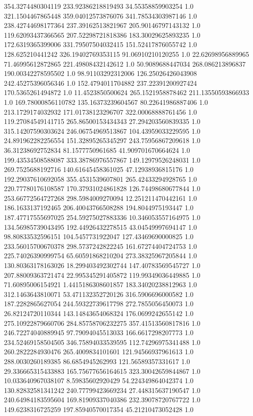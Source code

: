 354.3274480304119	233.92386218819493	34.55358859903254	1.0
321.1504467865448	359.04012573876076	341.78534303987146	1.0
238.42744698177364	237.39162513821967	205.90146797143132	1.0
119.62093437366565	207.52298721818386	183.30029625893235	1.0
172.6319365399006	331.79507504032415	151.52417876055742	1.0
128.625210441242	326.19402769353115	91.06910210120255	1.0
22.62698956889965	71.46995612872865	221.49808432142612	1.0
50.9089688447034	268.086213896837	190.00342278595502	1.0
98.91103292312006	126.25026426043908	242.45275396056346	1.0
152.4794011704882	237.22391200927424	170.5365261494872	1.0
11.4523850500624	265.1521958878462	211.13550593866933	1.0
169.78000856110782	135.16373239604567	80.22641986887406	1.0
213.1729174032932	171.01738123296707	322.00068888761456	1.0
119.27084549141715	265.86500153434343	27.294203560839335	1.0
315.14207590303624	246.06754969513867	104.43959033229595	1.0
24.891962282256554	151.32895265345297	243.75956867209618	1.0
36.31238692752834	81.1577750961685	41.909701670664624	1.0
199.43534508588087	333.38786976557867	149.12979526248031	1.0
269.7525688192716	140.61645458361025	47.12938936815176	1.0
192.29037610692058	355.4531539607801	265.42433294928765	1.0
220.77780176108587	170.37931024861828	126.74498680677844	1.0
253.66772564727268	298.5984009270094	12.251211470442161	1.0
186.1633137192465	206.40043766508288	194.8044975193447	1.0
187.47717555697025	254.59275027883336	10.346053557164975	1.0
134.56985739043495	192.44926432278515	43.04549997694147	1.0
98.80833532596151	104.5457731922047	127.43469690000825	1.0
233.56015700670378	298.5737242822245	161.67274404724753	1.0
225.74026390999754	65.60591868210204	273.38325967205844	1.0
130.80363178163026	18.299403492302744	147.40783569545727	1.0
207.88009363721474	22.995345291405872	119.99349036449885	1.0
71.60895006154921	1.4415186308601857	183.34020238812963	1.0
312.1463643810071	53.471132352720126	316.5906696000582	1.0
187.2282865627054	244.59322739617798	272.7855056450073	1.0
26.82124720110344	143.14843654068324	176.0699242655142	1.0
275.10922879660706	284.85758706232275	357.41513560817816	1.0
246.72274040889945	97.79094045513033	166.6617298207773	1.0
234.52469158504505	346.75894033539595	112.74296975341488	1.0
260.2822284930476	265.4009834101601	121.94566937961613	1.0
288.0030260189385	86.6854945262993	121.56589357331617	1.0
29.336665315433883	165.75677656164615	323.30042659844867	1.0
10.033640967038107	8.59835602920429	54.224349864042374	1.0
130.82832581341242	240.77799423669234	27.448315637190547	1.0
240.64984183595604	169.81909337040386	232.39078720767722	1.0
149.6238316725259	197.85940570017354	45.21210473052428	1.0
